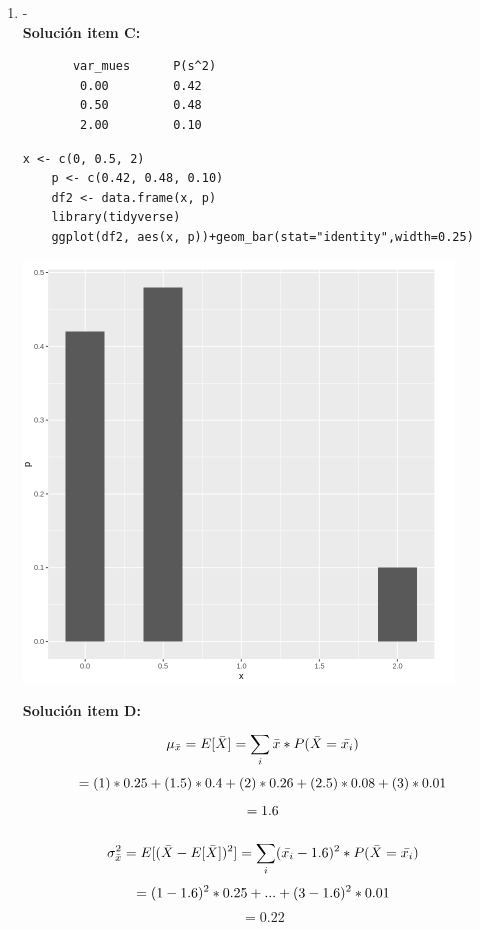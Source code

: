 \begin{enumerate}

    \item-
    \\
    \textbf{Solución item C:}
    \begin{verbatim}
       var_mues      P(s^2)
        0.00         0.42
        0.50         0.48
        2.00         0.10
    \end{verbatim}
    
    \begin{lstlisting}[frame=single]
    x <- c(0, 0.5, 2)
    p <- c(0.42, 0.48, 0.10)
    df2 <- data.frame(x, p)
    library(tidyverse)
    ggplot(df2, aes(x, p))+geom_bar(stat="identity",width=0.25)
    \end{lstlisting}
    
    \includegraphics[scale=0.8]{img/v_muest.png}
    
    \textbf{Solución item D:}
    $$
    \mu_ {\bar{x}} =E[\bar{X}]=\sum_{i}^{}\bar{x}*P(\bar{X}=\bar{x_i})\\$$$$
    =(1)*0.25+(1.5)*0.4+(2)*0.26+(2.5)*0.08+(3)*0.01\\$$$$
    =1.6\\\\$$$$
    $$
    $$
    \sigma_ {\bar{x}}^2 =E[(\bar{X}-E[\bar{X}])^2]=\sum_{i}^{}(\bar{x_i}-1.6)^2*P(\bar{X}=\bar{x_i})\\$$$$
    =(1-1.6)^2*0.25+ . . . + (3-1.6)^2*0.01\\$$$$
    =0.22
    $$

\end{enumerate}